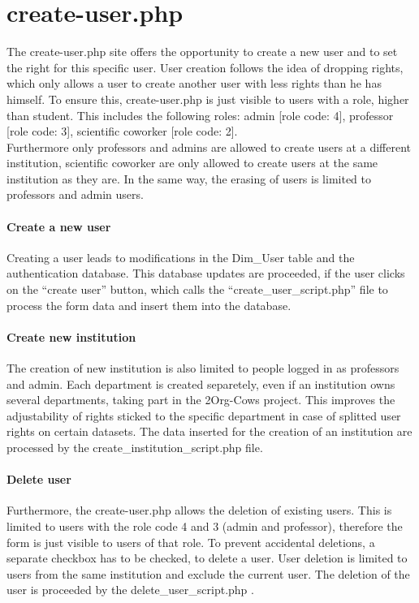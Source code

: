
\label{create-user.php}
\section{create-user.php}
The create-user.php site offers the opportunity to create a new user and to set the right for this specific user. User creation follows the idea of dropping rights, 
which only allows a user to create another user with less rights than he has himself. To ensure this, create-user.php is just visible to users with a role, higher than student.
This includes the following roles: admin [role code: 4], professor [role code: 3], scientific coworker [role code: 2]. \\
Furthermore only professors and admins are allowed to create users at a different institution, scientific coworker are only allowed to create users at the 
same institution as they are. In the same way, the erasing of users is limited to professors and admin users.
\paragraph{Create a new user}
Creating a user leads to modifications in the Dim\_User table and the authentication database. This database updates are proceeded, if the user clicks on 
the ``create user'' button, which calls the ``create\_user\_script.php'' file to process the form data and insert them into the database.
\paragraph{Create new institution}
The creation of new institution is also limited to people logged in as professors and admin. Each department is created separetely, even if an institution owns several departments, 
taking part in the 2Org-Cows project. This improves the adjustability of rights sticked to the specific department in case of splitted user rights on certain datasets.
The data inserted for the creation of an institution are processed by the create\_institution\_script.php file.
\paragraph{Delete user}
Furthermore, the create-user.php allows the deletion of existing users. This is limited to users with the role code 4 and 3 (admin and professor), therefore the form is just visible 
to users of that role. To prevent accidental deletions, a separate checkbox has to be checked, to delete a user. User deletion is limited to users from the same institution and exclude 
the current user. The deletion of the user is proceeded by the delete\_user\_script.php .
